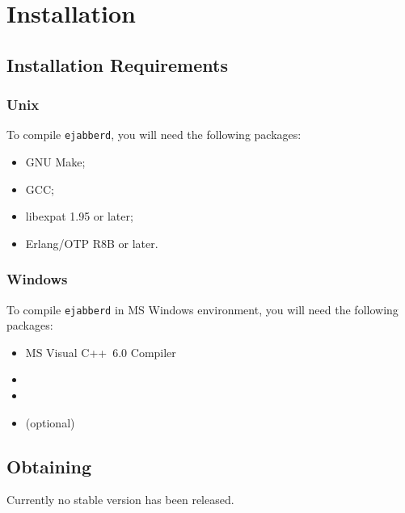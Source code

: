 \documentclass[10pt]{article}
\newcommand{\ejabberd}{\texttt{ejabberd}}
\begin{document}
\section{Installation}
\label{sec:installation}


\subsection{Installation Requirements}
\label{sec:installreq}

\subsubsection{Unix}
\label{sec:installrequnix}

To compile \ejabberd{}, you will need the following packages:
\begin{itemize}
\item GNU Make;
\item GCC;
\item libexpat 1.95 or later;
\item Erlang/OTP R8B or later.
\end{itemize}

\subsubsection{Windows}
\label{sec:installreqwin}

To compile \ejabberd{} in MS Windows environment, you will need the following
packages:
\begin{itemize}
\item MS Visual C++~6.0 Compiler
\item {}
\item {}
\item {} (optional)
\end{itemize}



\subsection{Obtaining}
\label{sec:obtaining}

Currently no stable version has been released.
\end{document}
